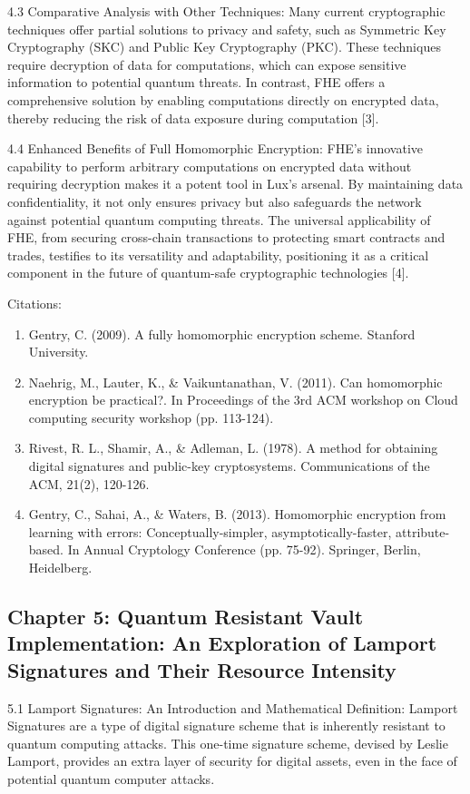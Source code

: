 \documentclass[11pt]{article}
\begin{document}
4.3 Comparative Analysis with Other Techniques: Many current cryptographic techniques offer partial solutions to privacy and safety, such as Symmetric Key Cryptography (SKC) and Public Key Cryptography (PKC). These techniques require decryption of data for computations, which can expose sensitive information to potential quantum threats. In contrast, FHE offers a comprehensive solution by enabling computations directly on encrypted data, thereby reducing the risk of data exposure during computation [3].


4.4 Enhanced Benefits of Full Homomorphic Encryption: FHE's innovative capability to perform arbitrary computations on encrypted data without requiring decryption makes it a potent tool in Lux's arsenal. By maintaining data confidentiality, it not only ensures privacy but also safeguards the network against potential quantum computing threats. The universal applicability of FHE, from securing cross-chain transactions to protecting smart contracts and trades, testifies to its versatility and adaptability, positioning it as a critical component in the future of quantum-safe cryptographic technologies [4].


Citations:

\begin{enumerate}
  \item Gentry, C. (2009). A fully homomorphic encryption scheme. Stanford University.
  \item Naehrig, M., Lauter, K., \& Vaikuntanathan, V. (2011). Can homomorphic encryption be practical?. In Proceedings of the 3rd ACM workshop on Cloud computing security workshop (pp. 113-124).
  \item Rivest, R. L., Shamir, A., \& Adleman, L. (1978). A method for obtaining digital signatures and public-key cryptosystems. Communications of the ACM, 21(2), 120-126.
  \item Gentry, C., Sahai, A., \& Waters, B. (2013). Homomorphic encryption from learning with errors: Conceptually-simpler, asymptotically-faster, attribute-based. In Annual Cryptology Conference (pp. 75-92). Springer, Berlin, Heidelberg.
\end{enumerate}

\subsection{Chapter 5: Quantum Resistant Vault Implementation: An Exploration of Lamport Signatures and Their Resource Intensity}

5.1 Lamport Signatures: An Introduction and Mathematical Definition: Lamport Signatures are a type of digital signature scheme that is inherently resistant to quantum computing attacks. This one-time signature scheme, devised by Leslie Lamport, provides an extra layer of security for digital assets, even in the face of potential quantum computer attacks.
\end{document}
